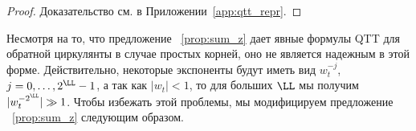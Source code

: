 \begin{proof}
	Доказательство см. в Приложении~\ref{app:qtt_repr}.
\end{proof}



Несмотря на то, что предложение ~\ref{prop:sum_z} дает явные формулы QTT для обратной циркулянты в случае простых корней, оно не является надежным в этой форме.
Действительно, некоторые экспоненты будут иметь вид $w_t^{-j}$, $j=0,\dots,2^{\LL}-1$, а так как $|w_{t}|<1$, то для больших $\LL$ мы получим $|w_t^{-2^{\LL}}| \gg 1$.
Чтобы избежать этой проблемы, мы модифицируем предложение ~\ref{prop:sum_z} следующим образом.

